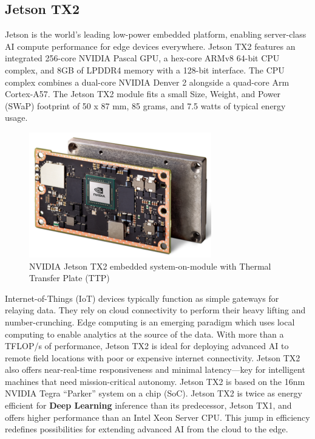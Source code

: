     \subsection{Jetson TX2}
        Jetson is the world’s leading low-power embedded platform, enabling server-class AI compute performance for edge devices everywhere. Jetson TX2 features an integrated 256-core NVIDIA Pascal GPU, a hex-core ARMv8 64-bit CPU complex, and 8GB of LPDDR4 memory with 
        a 128-bit interface. The CPU complex combines a dual-core NVIDIA Denver 2 alongside a quad-core Arm Cortex-A57. The Jetson TX2 module fits a small Size, Weight, and Power (SWaP) footprint of 50 x 87 mm, 85 grams, and 7.5 watts of typical energy usage.
        \begin{figure}[H]
            \centering
            \includegraphics[width=0.6\linewidth]{img/tx2.png}
            \caption{NVIDIA Jetson TX2 embedded system-on-module with Thermal Transfer Plate (TTP)}
        \end{figure}
        Internet-of-Things (IoT) devices typically function as simple gateways for relaying data. They rely on cloud connectivity to perform their heavy lifting and number-crunching. Edge computing is an emerging paradigm which uses local computing to enable analytics at 
        the source of the data. With more than a TFLOP/s of performance, Jetson TX2 is ideal for deploying advanced AI to remote field locations with poor or expensive internet connectivity. Jetson TX2 also offers near-real-time responsiveness and minimal latency—key for 
        intelligent machines that need mission-critical autonomy.
        Jetson TX2 is based on the 16nm NVIDIA Tegra “Parker” system on a chip (SoC). Jetson TX2 is twice as energy efficient for \textbf{Deep Learning} inference than its predecessor, Jetson TX1, and offers higher performance than an Intel Xeon Server CPU. This jump in efficiency 
        redefines possibilities for extending advanced AI from the cloud to the edge.
